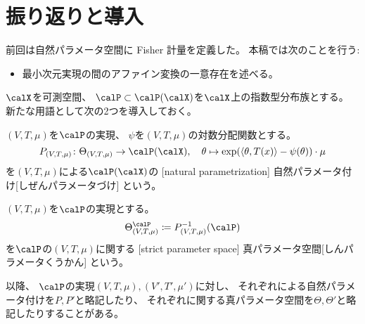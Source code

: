 \documentclass[report]{jlreq}
\begin{document}
%

%
\section*{振り返りと導入}

前回は自然パラメータ空間に Fisher 計量を定義した。
本稿では次のことを行う:
\begin{itemize}
    \item 最小次元実現の間のアファイン変換の一意存在を述べる。
\end{itemize}

$\calX$を可測空間、
$\calP \subset \calP(\calX)$を$\calX$上の指数型分布族とする。
新たな用語として次の2つを導入しておく。

\begin{definition}[自然パラメータ付け]
    $(V, T, \mu)$を$\calP$の実現、
    $\psi$を$(V, T, \mu)$の対数分配関数とする。
    \begin{equation}
        P_{(V, T, \mu)} \colon \Theta_{(V, T, \mu)} \to \calP(\calX),
            \quad
            \theta
            \mapsto
            \exp (\myangle{\theta}{T(x)} - \psi(\theta)) \cdot \mu
    \end{equation}
    を$(V, T, \mu)$による$\calP(\calX)$の
    [natural parametrization]
        {自然パラメータ付け}[しぜんパラメータづけ]
    という。
\end{definition}

\begin{definition}[真パラメータ空間]
    $(V, T, \mu)$を$\calP$の実現とする。
    \begin{equation}
        \Theta^\calP_{(V, T, \mu)}
            \coloneqq P_{(V, T, \mu)}^{-1}(\calP)
    \end{equation}
    を$\calP$の$(V, T, \mu)$に関する
    [strict parameter space]
        {真パラメータ空間}[しんパラメータくうかん]
    という。
\end{definition}

以降、
$\calP$の実現$(V, T, \mu), (V', T', \mu')$に対し、
それぞれによる自然パラメータ付けを$P, P'$と略記したり、
それぞれに関する真パラメータ空間を$\Theta, \Theta'$と略記したりすることがある。

%
\end{document}
